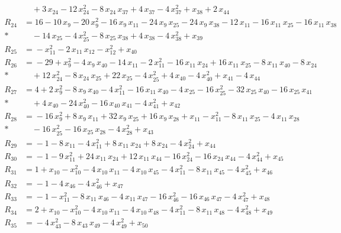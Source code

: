 \begin{align*}
&\quad{} +3\,x_{24} -12\,x_{24}^{2} -8\,x_{24}\,x_{37} +4\,x_{37} -4\,x_{37}^{2} +x_{38} +2\,x_{44} \\[3pt]
R_{24} &={} 16 -10\,x_{9} -20\,x_{9}^{2} -16\,x_{9}\,x_{11} -24\,x_{9}\,x_{25} -24\,x_{9}\,x_{38} -12\,x_{11} -16\,x_{11}\,x_{25} -16\,x_{11}\,x_{38} \\*
&\quad{} -14\,x_{25} -4\,x_{25}^{2} -8\,x_{25}\,x_{38} +4\,x_{38} -4\,x_{38}^{2} +x_{39} \\[3pt]
R_{25} &={} -x_{11}^{2} -2\,x_{11}\,x_{12} -x_{12}^{2} +x_{40} \\[3pt]
R_{26} &={} -29 +x_{9}^{2} -4\,x_{9}\,x_{40} -14\,x_{11} -2\,x_{11}^{2} -16\,x_{11}\,x_{24} +16\,x_{11}\,x_{25} -8\,x_{11}\,x_{40} -8\,x_{24} \\*
&\quad{} +12\,x_{24}^{2} -8\,x_{24}\,x_{25} +22\,x_{25} -4\,x_{25}^{2} +4\,x_{40} -4\,x_{40}^{2} +x_{41} -4\,x_{44} \\[3pt]
R_{27} &={} 4 +2\,x_{9}^{2} -8\,x_{9}\,x_{40} -4\,x_{11}^{2} -16\,x_{11}\,x_{40} -4\,x_{25} -16\,x_{25}^{2} -32\,x_{25}\,x_{40} -16\,x_{25}\,x_{41} \\*
&\quad{} +4\,x_{40} -24\,x_{40}^{2} -16\,x_{40}\,x_{41} -4\,x_{41}^{2} +x_{42} \\[3pt]
R_{28} &={} -16\,x_{9}^{2} +8\,x_{9}\,x_{11} +32\,x_{9}\,x_{25} +16\,x_{9}\,x_{28} +x_{11} -x_{11}^{2} -8\,x_{11}\,x_{25} -4\,x_{11}\,x_{28} \\*
&\quad{} -16\,x_{25}^{2} -16\,x_{25}\,x_{28} -4\,x_{28}^{2} +x_{43} \\[3pt]
R_{29} &={} -1 -8\,x_{11} -4\,x_{11}^{2} +8\,x_{11}\,x_{24} +8\,x_{24} -4\,x_{24}^{2} +x_{44} \\[3pt]
R_{30} &={} -1 -9\,x_{11}^{2} +24\,x_{11}\,x_{24} +12\,x_{11}\,x_{44} -16\,x_{24}^{2} -16\,x_{24}\,x_{44} -4\,x_{44}^{2} +x_{45} \\[3pt]
R_{31} &={} 1 +x_{10} -x_{10}^{2} -4\,x_{10}\,x_{11} -4\,x_{10}\,x_{45} -4\,x_{11}^{2} -8\,x_{11}\,x_{45} -4\,x_{45}^{2} +x_{46} \\[3pt]
R_{32} &={} -1 -4\,x_{46} -4\,x_{46}^{2} +x_{47} \\[3pt]
R_{33} &={} -1 -x_{11}^{2} -8\,x_{11}\,x_{46} -4\,x_{11}\,x_{47} -16\,x_{46}^{2} -16\,x_{46}\,x_{47} -4\,x_{47}^{2} +x_{48} \\[3pt]
R_{34} &={} 2 +x_{10} -x_{10}^{2} -4\,x_{10}\,x_{11} -4\,x_{10}\,x_{48} -4\,x_{11}^{2} -8\,x_{11}\,x_{48} -4\,x_{48}^{2} +x_{49} \\[3pt]
R_{35} &={} -4\,x_{43}^{2} -8\,x_{43}\,x_{49} -4\,x_{49}^{2} +x_{50} \\[3pt]

\end{align*}
